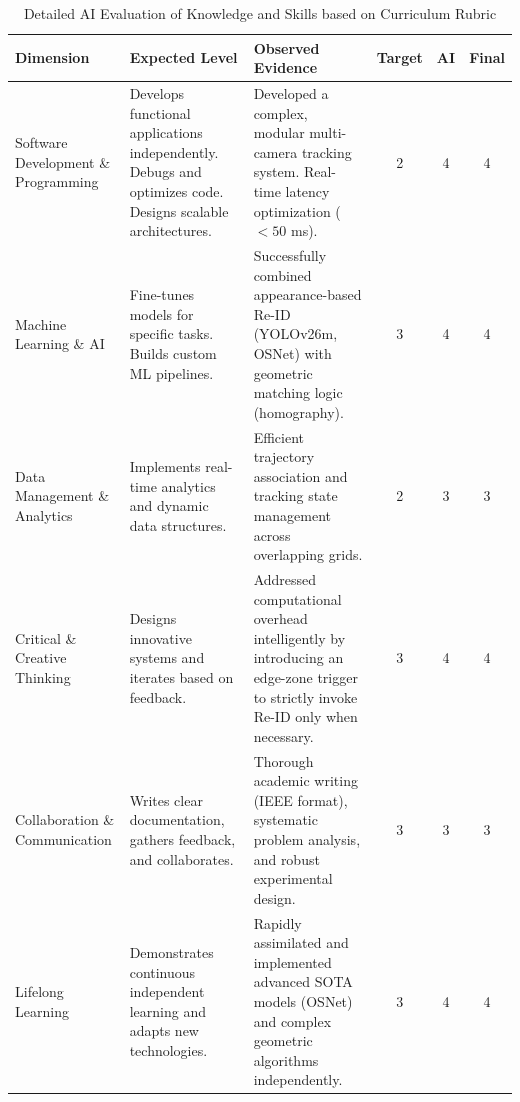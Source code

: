 \begin{table}[H]
    \centering
    \small
    \begin{tabularx}{\textwidth}{|p{2.8cm}|X|X|c|c|c|}
        \hline
        \textbf{Dimension} & \textbf{Expected Level} & \textbf{Observed Evidence} & \textbf{Target} & \textbf{AI} & \textbf{Final} \\
        \hline
        Software Development \& Programming & Develops functional applications independently. Debugs and optimizes code. Designs scalable architectures. & Developed a complex, modular multi-camera tracking system. Real-time latency optimization ($<50$ ms). & 2 & 4 & 4 \\
        \hline
        Machine Learning \& AI & Fine-tunes models for specific tasks. Builds custom ML pipelines. & Successfully combined appearance-based Re-ID (YOLOv26m, OSNet) with geometric matching logic (homography). & 3 & 4 & 4 \\
        \hline
        Data Management \& Analytics & Implements real-time analytics and dynamic data structures. & Efficient trajectory association and tracking state management across overlapping grids. & 2 & 3 & 3 \\
        \hline
        Critical \& Creative Thinking & Designs innovative systems and iterates based on feedback. & Addressed computational overhead intelligently by introducing an edge-zone trigger to strictly invoke Re-ID only when necessary. & 3 & 4 & 4 \\
        \hline
        Collaboration \& Communication & Writes clear documentation, gathers feedback, and collaborates. & Thorough academic writing (IEEE format), systematic problem analysis, and robust experimental design. & 3 & 3 & 3 \\
        \hline
        Lifelong Learning & Demonstrates continuous independent learning and adapts new technologies. & Rapidly assimilated and implemented advanced SOTA models (OSNet) and complex geometric algorithms independently. & 3 & 4 & 4 \\
        \hline
    \end{tabularx}
    \caption{Detailed AI Evaluation of Knowledge and Skills based on Curriculum Rubric}
\end{table}

